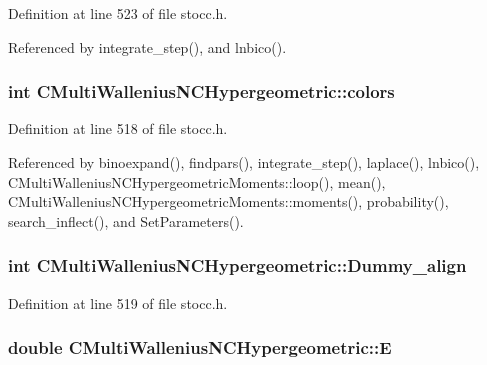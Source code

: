 Definition at line 523 of file stocc.\-h.



Referenced by integrate\-\_\-step(), and lnbico().

\subsubsection[{colors}]{\setlength{\rightskip}{0pt plus 5cm}int C\-Multi\-Wallenius\-N\-C\-Hypergeometric\-::colors\hspace{0.3cm}{\ttfamily [protected]}}\label{class_c_multi_wallenius_n_c_hypergeometric_a4a0cdf840a5ef6e8c0ceee9b13e19c44}


Definition at line 518 of file stocc.\-h.



Referenced by binoexpand(), findpars(), integrate\-\_\-step(), laplace(), lnbico(), C\-Multi\-Wallenius\-N\-C\-Hypergeometric\-Moments\-::loop(), mean(), C\-Multi\-Wallenius\-N\-C\-Hypergeometric\-Moments\-::moments(), probability(), search\-\_\-inflect(), and Set\-Parameters().

\subsubsection[{Dummy\-\_\-align}]{\setlength{\rightskip}{0pt plus 5cm}int C\-Multi\-Wallenius\-N\-C\-Hypergeometric\-::\-Dummy\-\_\-align\hspace{0.3cm}{\ttfamily [protected]}}\label{class_c_multi_wallenius_n_c_hypergeometric_aeebfdaed14c25e12c6f12cf02b81759f}


Definition at line 519 of file stocc.\-h.

\subsubsection[{E}]{\setlength{\rightskip}{0pt plus 5cm}double C\-Multi\-Wallenius\-N\-C\-Hypergeometric\-::\-E\hspace{0.3cm}{\ttfamily [protected]}}\label{class_c_multi_wallenius_n_c_hypergeometric_add69b9b68c87a8166e33c2b2f5085062}


